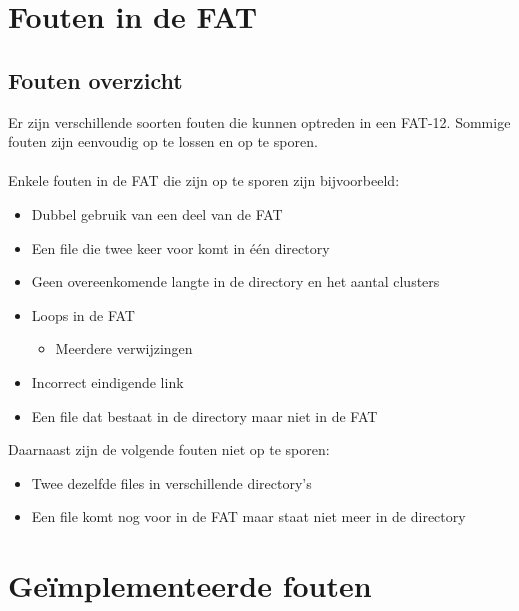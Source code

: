 \documentclass[11pt]{article}
\begin{document}
	\newpage

	\section{Fouten in de FAT}\label{sec:fout}
	\subsection{Fouten overzicht}\label{sec:overzicht}
	Er zijn verschillende soorten fouten die kunnen optreden in een FAT-12. Sommige fouten zijn eenvoudig op te lossen en op te sporen.\\\\
	Enkele fouten in de FAT die zijn op te sporen zijn bijvoorbeeld:
	\begin{itemize}
		\item Dubbel gebruik van een deel van de FAT
		\item Een file die twee keer voor komt in \'e\'en directory
		\item Geen overeenkomende langte in de directory en het aantal clusters
		\item Loops in de FAT
		\begin{itemize}
			\item Meerdere verwijzingen 
		\end{itemize}
		\item Incorrect eindigende link
		\item Een file dat bestaat in de directory maar niet in de FAT
	\end{itemize}
	Daarnaast zijn de volgende fouten niet op te sporen:
	\begin{itemize}
		\item Twee dezelfde files in verschillende directory's
		\item Een file komt nog voor in de FAT maar staat niet meer in de directory
	\end{itemize}

	\newpage

	\section{Ge\"implementeerde fouten}\label{sec:impfout}
\end{document}
